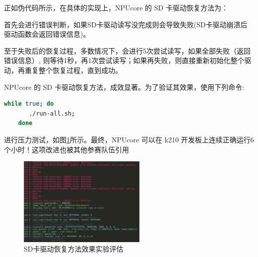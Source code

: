 正如伪代码所示，在具体的实现上，NPUcore 的 SD 卡驱动恢复方法为：

首先会进行错误判断，如果SD卡驱动读写没完成则会导致失败(SD卡驱动崩溃后驱动函数会返回错误信息)。

至于失败后的恢复过程，多数情况下，会进行5次尝试读写，如果全部失败（返回错误信息）, 则等待1秒，再1次尝试读写；如果再失败，则直接重新初始化整个驱动，再重复整个恢复过程，直到成功。

NPUcore 的 SD 卡驱动恢复方法，成效显著。为了验证其效果，使用下列命令:

\begin{lstlisting}[language=bash]
	while true; do 
	   ./run-all.sh; 
	done
\end{lstlisting}

进行压力测试，如图\ref{fig:SD recovery}所示。最终，NPUcore 可以在 k210 开发板上连续正确运行6个小时！这项改进也被其他参赛队伍引用

\begin{figure}[h]
	\centering
	\includegraphics[width=0.55\textwidth]{figures/10-04-SD卡驱动读写错误恢复方法效果实验评估.png}
	\caption{SD卡驱动恢复方法效果实验评估}
	\label{fig:SD recovery}
\end{figure}


